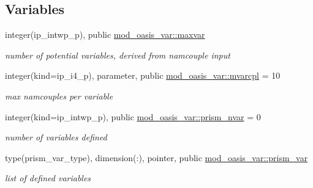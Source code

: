 \subsection*{Variables}
\begin{DoxyCompactItemize}
\item 
integer(ip\+\_\+intwp\+\_\+p), public \hyperlink{namespacemod__oasis__var_a151c4be67882fc8d02f66e4a1822b692}{mod\+\_\+oasis\+\_\+var\+::maxvar}
\begin{DoxyCompactList}\small\item\em number of potential variables, derived from namcouple input \end{DoxyCompactList}\item 
integer(kind=ip\+\_\+i4\+\_\+p), parameter, public \hyperlink{namespacemod__oasis__var_a687d6dce16699f36ae3a67accfdba3a9}{mod\+\_\+oasis\+\_\+var\+::mvarcpl} = 10
\begin{DoxyCompactList}\small\item\em max namcouples per variable \end{DoxyCompactList}\item 
integer(kind=ip\+\_\+intwp\+\_\+p), public \hyperlink{namespacemod__oasis__var_a095f8ad84e6afbcbe1744d4a9f924e08}{mod\+\_\+oasis\+\_\+var\+::prism\+\_\+nvar} = 0
\begin{DoxyCompactList}\small\item\em number of variables defined \end{DoxyCompactList}\item 
type(prism\+\_\+var\+\_\+type), dimension(\+:), pointer, public \hyperlink{namespacemod__oasis__var_ae66c490437c2960d795fbd3d2c773a0a}{mod\+\_\+oasis\+\_\+var\+::prism\+\_\+var}
\begin{DoxyCompactList}\small\item\em list of defined variables \end{DoxyCompactList}\end{DoxyCompactItemize}
